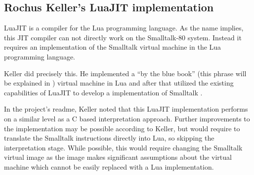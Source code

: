 \subsection{Rochus Keller's LuaJIT implementation}
LuaJIT is a \jit{} compiler for the Lua programming language. As the name implies, this JIT compiler can not directly work on the Smalltalk-80 system. Instead it requires an implementation of the Smalltalk virtual machine in the Lua programming language.

Keller did precisely this. He implemented a \enquote{by the blue book} (this phrase will be explained in ) virtual machine in Lua and after that utilized the existing capabilities of LuaJIT to develop a \jit{} implementation of Smalltalk \cite{Keller2021}.

In the project's readme, Keller noted that this LuaJIT implementation performs on a similar level as a C\+\+ based interpretation approach. 
Further improvements to the implementation may be possible according to Keller, but would require to translate the Smalltalk instructions directly into Lua, so skipping the interpretation stage. While possible, this would require changing the Smalltalk virtual image as the image makes significant assumptions about the virtual machine which cannot be easily replaced with a Lua implementation.
